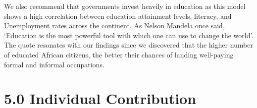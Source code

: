 \documentclass[12pt]{article}
\renewcommand{\_}{\kern-1.5pt\textunderscore\kern-1.5pt}
\begin{document}
\vspace{\baselineskip}
\begin{justify}
{\fontsize{9pt}{10.8pt}\selectfont We also recommend that governments invest heavily in education as this model shows a high correlation between education attainment levels, literacy, and Unemployment rates across the continent. As Nelson Mandela once said, ‘Education is the most powerful tool with which one can use to change the world’. The quote resonates with our findings since we discovered that the higher number of educated African citizens, the better their chances of landing well-paying formal and informal occupations.\par}
\end{justify}
\section*{5.0 Individual Contribution}


\end{document}
